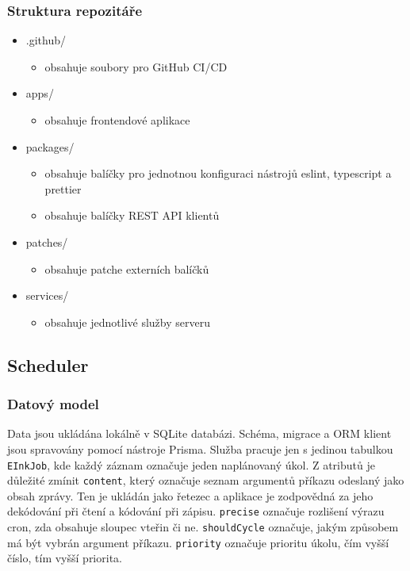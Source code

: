 \subsubsection{Struktura repozitáře}
\begin{itemize}
    \item .github/
        \begin{itemize}
            \item obsahuje soubory pro GitHub CI/CD
        \end{itemize}
    \item apps/
        \begin{itemize}
            \item obsahuje frontendové aplikace
        \end{itemize}
    \item packages/
        \begin{itemize}
            \item obsahuje balíčky pro jednotnou konfiguraci nástrojů eslint, typescript a prettier
            \item obsahuje balíčky REST API klientů
        \end{itemize}
    \item patches/
        \begin{itemize}
            \item obsahuje patche externích balíčků
        \end{itemize}
    \item services/
        \begin{itemize}
            \item obsahuje jednotlivé služby serveru
        \end{itemize}
\end{itemize}

\subsection{Scheduler}
\subsubsection{Datový model}
Data jsou ukládána lokálně v SQLite databázi. Schéma, migrace a ORM klient jsou spravovány pomocí nástroje Prisma. Služba pracuje jen s jedinou tabulkou \lstinline|EInkJob|, kde každý záznam označuje jeden naplánovaný úkol. Z atributů je důležité zmínit \lstinline|content|, který označuje seznam argumentů příkazu odeslaný jako obsah zprávy. Ten je ukládán jako řetezec a aplikace je zodpovědná za jeho dekódování při čtení a kódování při zápisu. \lstinline|precise| označuje rozlišení výrazu cron, zda obsahuje sloupec vteřin či ne. \lstinline|shouldCycle| označuje, jakým způsobem má být vybrán argument příkazu. \lstinline|priority| označuje prioritu úkolu, čím vyšší číslo, tím vyšší priorita.

